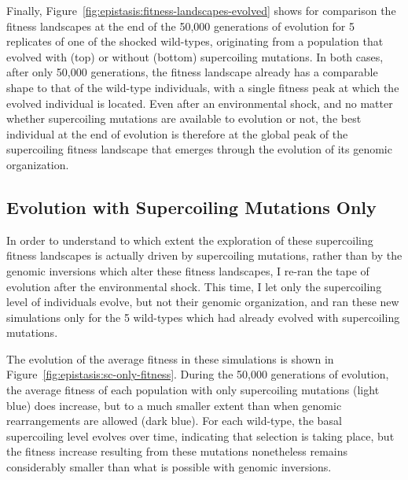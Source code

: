 Finally, Figure~\ref{fig:epistasis:fitness-landscapes-evolved} shows for comparison the fitness landscapes at the end of the 50,000 generations of evolution for 5 replicates of one of the shocked wild-types, originating from a population that evolved with (top) or without (bottom) supercoiling mutations.
In both cases, after only 50,000 generations, the fitness landscape already has a comparable shape to that of the wild-type individuals, with a single fitness peak at which the evolved individual is located.
Even after an environmental shock, and no matter whether supercoiling mutations are available to evolution or not, the best individual at the end of evolution is therefore at the global peak of the supercoiling fitness landscape that emerges through the evolution of its genomic organization.

\subsection{Evolution with Supercoiling Mutations Only}

In order to understand to which extent the exploration of these supercoiling fitness landscapes is actually driven by supercoiling mutations, rather than by the genomic inversions which alter these fitness landscapes, I re-ran the tape of evolution after the environmental shock.
This time, I let only the supercoiling level of individuals evolve, but not their genomic organization, and ran these new simulations only for the 5 wild-types which had already evolved with supercoiling mutations.

The evolution of the average fitness in these simulations is shown in Figure~\ref{fig:epistasis:sc-only-fitness}.
During the 50,000 generations of evolution, the average fitness of each population with only supercoiling mutations (light blue) does increase, but to a much smaller extent than when genomic rearrangements are allowed (dark blue).
For each wild-type, the basal supercoiling level evolves over time, indicating that selection is taking place, but the fitness increase resulting from these mutations nonetheless remains considerably smaller than what is possible with genomic inversions.

